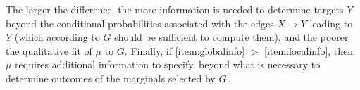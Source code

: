 \documentclass[letterpaper]{article} %
\theoremstyle{plain}
\theoremstyle{definition}
\theoremstyle{remark}
\begin{document}
The larger the difference,  the more information is needed to determine
targets $Y$ beyond the conditional probabilities associated with the
edges $X \rightarrow Y$ leading to $Y$
(which according to $G$ should be sufficient to compute them), 
%
and the poorer the qualitative fit of $\mu$ to $G$.
Finally,
if \ref{item:globalinfo} $>$ \ref{item:localinfo}, then 
$\mu$ requires
additional information to specify, beyond
what is necessary to determine outcomes of the marginals selected by $G$.
\end{document}
